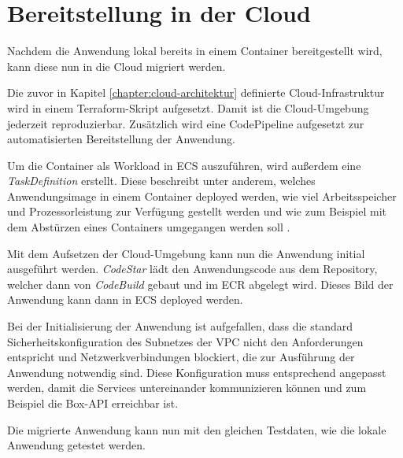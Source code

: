 \section{Bereitstellung in der Cloud}

Nachdem die Anwendung lokal bereits in einem Container bereitgestellt wird, kann diese nun in die Cloud migriert werden.

Die zuvor in Kapitel \ref{chapter:cloud-architektur} definierte Cloud-Infrastruktur wird in einem \gls{Terraform}-Skript aufgesetzt. Damit ist die Cloud-Umgebung jederzeit reproduzierbar. Zusätzlich wird eine CodePipeline aufgesetzt zur automatisierten Bereitstellung der Anwendung.

Um die Container als Workload in ECS auszuführen, wird außerdem eine \textit{TaskDefinition} erstellt. Diese beschreibt unter anderem, welches Anwendungsimage in einem Container deployed werden, wie viel Arbeitsspeicher und Prozessorleistung zur Verfügung gestellt werden und wie zum Beispiel mit dem Abstürzen eines Containers umgegangen werden soll \cite[Vgl.][]{AWSECS}.

Mit dem Aufsetzen der Cloud-Umgebung kann nun die Anwendung initial ausgeführt werden. \textit{CodeStar} lädt den Anwendungscode aus dem \gls{Repository}, welcher dann von \textit{CodeBuild} gebaut und im \ac{ECR} abgelegt wird. Dieses Bild der Anwendung kann dann in \ac{ECS} deployed werden.

Bei der Initialisierung der Anwendung ist aufgefallen, dass die standard Sicherheitskonfiguration des Subnetzes der \ac{VPC} nicht den Anforderungen entspricht und Netzwerkverbindungen blockiert, die zur Ausführung der Anwendung notwendig sind. Diese Konfiguration muss entsprechend angepasst werden, damit die Services untereinander kommunizieren können und zum Beispiel die \gls{Box}-\ac{API} erreichbar ist.

Die migrierte Anwendung kann nun mit den gleichen Testdaten, wie die lokale Anwendung getestet werden.


